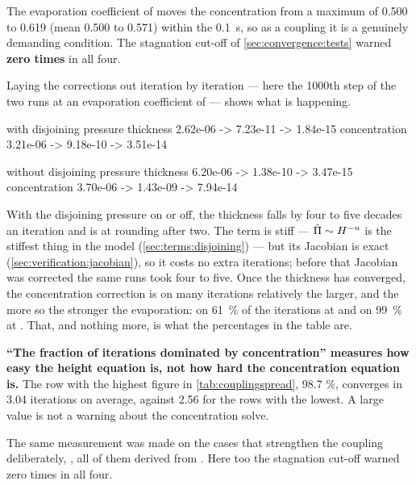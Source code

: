 The evaporation coefficient of  moves the concentration from a
maximum of 0.500 to 0.619 (mean 0.500 to 0.571) within the
\SI{0.1}{\second}, so as a coupling it is a genuinely demanding condition. The
stagnation cut-off of \cref{sec:convergence:tests} warned \textbf{zero times} in
all four.

Laying the corrections out iteration by iteration --- here the 1000th step of
the two runs at an evaporation coefficient of  --- shows what is
happening.

\begin{plain}
  with disjoining pressure     thickness     2.62e-06 -> 7.23e-11 -> 1.84e-15
                               concentration 3.21e-06 -> 9.18e-10 -> 3.51e-14

  without disjoining pressure  thickness     6.20e-06 -> 1.38e-10 -> 3.47e-15
                               concentration 3.70e-06 -> 1.43e-09 -> 7.94e-14
\end{plain}

With the disjoining pressure on or off, the thickness falls by four to five
decades an iteration and is at rounding after two. The term is stiff --- $\hat{\Pi} \sim H^{-n}$
is the stiffest thing in the model (\cref{sec:terms:disjoining}) --- but its
Jacobian is exact (\cref{sec:verification:jacobian}), so it costs no extra
iterations; before that Jacobian was corrected the same runs took four to
five. Once the thickness has converged, the concentration correction is on
many iterations relatively the larger, and the more so the stronger the
evaporation: on \SI{61}{\percent} of the iterations at  and on
\SI{99}{\percent} at . That, and nothing more, is what the
percentages in the table are.

\begin{warn}
  \textbf{``The fraction of iterations dominated by concentration'' measures how
  easy the height equation is, not how hard the concentration equation is.} The
  row with the highest figure in \cref{tab:couplingspread}, 98.7 \%, converges
  in 3.04 iterations on average, against 2.56 for the rows with the lowest. A
  large value is not a warning about the concentration solve.
\end{warn}

The same measurement was made on the cases that strengthen the coupling
deliberately, , all of them derived from
. Here too the stagnation cut-off warned zero times in all
four.

